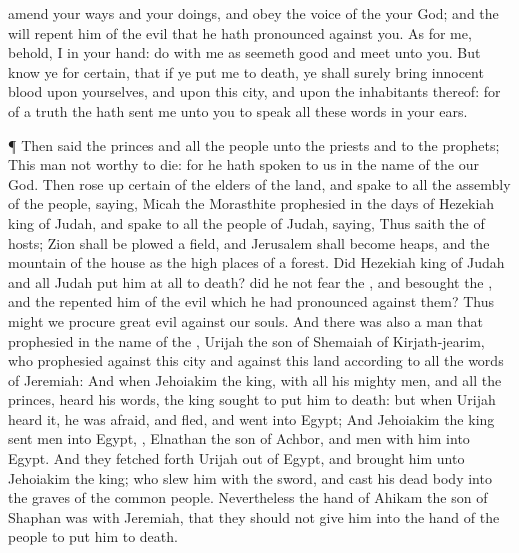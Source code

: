 {amend your
ways and your
doings, and
obey the
voice of the
{} your
God; and the
{} will
repent him of the
evil that he hath
pronounced against you.
As for me, behold, I
{} in your
hand:
do with me as
seemeth
good and
meet unto you.
But
know ye for
certain, that if ye put me to
death, ye shall surely
bring
innocent
blood upon yourselves, and upon this
city, and upon the
inhabitants thereof: for of a
truth the
{} hath
sent me unto you to
speak all these
words in your
ears.
\par }{\PP {}¶ Then
said the
princes and all the
people unto the
priests and to the
prophets; This
man
{} not
worthy to
die: for he hath
spoken to us in the
name of the
{} our
God.
Then rose
up
certain of the
elders of the
land, and
spake to all the
assembly of the
people,
saying,
Micah the
Morasthite
prophesied in the
days of
Hezekiah
king of
Judah, and
spake to all the
people of
Judah,
saying, Thus
saith the
{} of
hosts;
Zion shall be
plowed
{} a
field, and
Jerusalem shall become
heaps, and the
mountain of the
house as the high
places of a
forest.
Did
Hezekiah
king of
Judah and all
Judah put him at
all to
death? did he not
fear the
{}, and
besought the
{}, and the
{}
repented him of the
evil which he had
pronounced against them?
Thus might we
procure
great
evil against our
souls.
And there was also a
man that
prophesied in the
name of the
{},
Urijah the
son of
Shemaiah of
Kirjath-jearim, who
prophesied against this
city and against this
land according to all the
words of
Jeremiah:
And when
Jehoiakim the
king, with all his mighty
men, and all the
princes,
heard his
words, the
king
sought to put him to
death: but when
Urijah
heard it, he was
afraid, and
fled, and
went into
Egypt;
And
Jehoiakim the
king
sent
men into
Egypt,
{},
Elnathan the
son of
Achbor, and
{}
men with him into
Egypt.
And they fetched
forth
Urijah out of
Egypt, and
brought him unto
Jehoiakim the
king; who
slew him with the
sword, and
cast his dead
body into the
graves of the
common
people.
Nevertheless the
hand of
Ahikam the
son of
Shaphan was with
Jeremiah, that they should not
give him into the
hand of the
people to put him to
death.

}

